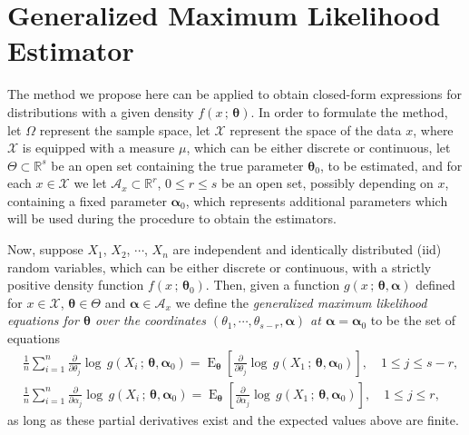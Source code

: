\documentclass[12pt]{article} %
\newcommand{\bs}{\boldsymbol}
\newcommand{\on}{\operatorname}
\theoremstyle{definition}
\begin{document}
\section{Generalized Maximum Likelihood Estimator}

The method we propose here can be applied to obtain closed-form expressions for distributions with a given density $f(x\,;\,\bs\theta)$. In order to formulate the method, let $\Omega$ represent the sample space, let $\mathcal{X}$ represent the space of the data $x$, where $\mathcal{X}$ is equipped with a measure $\mu$, which can be either discrete or continuous, let $\Theta\subset \mathbb{R}^{s}$ be an open set containing the true parameter $\bs{\theta}_0$, to be estimated, and for each $x\in \mathcal{X}$ we let $\mathcal{A}_x\subset \mathbb{R}^{r}$, $0\leq r\leq s$ be an open set, possibly depending on $x$, containing  a fixed parameter $\bs{\alpha}_0$, which represents additional parameters which will be used during the procedure to obtain the estimators.

Now, suppose $X_1$, $X_2$, $\cdots$, $X_n$ are independent and identically distributed (iid) random variables, which can be either discrete or continuous, with a strictly positive density function  $f(x\,;\,\bs{\theta}_0)$. Then, given a function $g(x\,;\,\bs{\theta},\bs{\alpha})$ defined for $x\in \mathcal{X}$, $\bs{\theta}\in \Theta$ and $\bs{\alpha}\in \mathcal{A}_x$ we define the \textit{generalized maximum likelihood equations for $\bs{\theta}$ over the coordinates $(\theta_1,\cdots,\theta_{s-r},\bs{\alpha})$ at $\bs{\alpha}=\bs{\alpha}_0$} to be the set of equations
\begin{equation}\label{modified}
\begin{aligned}
&\frac{1}{n}\sum_{i=1}^n \frac{\partial}{\partial \theta_j}  \log\, g(X_i\,;\,\bs{\theta},\bs{\alpha}_0) = \on{E}_{\bs{\theta}}\left[\frac{\partial}{\partial \theta_j}  \log\, g(X_1\,;\,\bs{\theta},\bs{\alpha}_0)\right],\quad 1\leq j\leq s-r,\\ &\frac{1}{n}
\sum_{i=1}^n \frac{\partial}{\partial \alpha_j}  \log\, g(X_i\,;\,\bs{\theta},\bs{\alpha}_0)=\on{E}_{\bs{\theta}}\left[\frac{\partial}{\partial \alpha_j}  \log\, g(X_1\,;\,\bs{\theta},\bs{\alpha}_0)\right], \quad  1\leq j\leq r,
\end{aligned}
\end{equation}
as long as these partial derivatives exist and the expected values above are finite.
\end{document}

